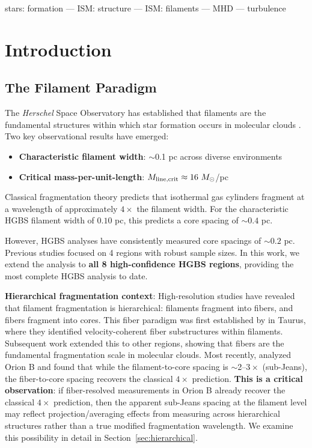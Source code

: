 \documentclass[11pt,a4paper]{article}
\begin{document}
stars: formation --- ISM: structure --- ISM: filaments --- MHD --- turbulence

\section{Introduction}

\subsection{The Filament Paradigm}

The \textit{Herschel} Space Observatory has established that filaments are the fundamental structures within which star formation occurs in molecular clouds \citep{Andre2010}. Two key observational results have emerged:

\begin{itemize}
    \item \textbf{Characteristic filament width}: $\sim$0.1 pc across diverse environments \citep{Arzoumanian2011}
    \item \textbf{Critical mass-per-unit-length}: $M_{\rm line,crit} \approx 16~M_\odot$/pc \citep{Ostriker1964}
\end{itemize}

Classical fragmentation theory \citep{Inutsuka1992} predicts that isothermal gas cylinders fragment at a wavelength of approximately $4\times$ the filament width. For the characteristic HGBS filament width of $0.10$ pc, this predicts a core spacing of $\sim0.4$ pc.

However, HGBS analyses have consistently measured core spacings of $\sim0.2$ pc. Previous studies focused on 4 regions with robust sample sizes. In this work, we extend the analysis to \textbf{all 8 high-confidence HGBS regions}, providing the most complete HGBS analysis to date.

\textbf{Hierarchical fragmentation context}: High-resolution studies have revealed that filament fragmentation is hierarchical: filaments fragment into fibers, and fibers fragment into cores. This fiber paradigm was first established by \citet{Hacar2013} in Taurus, where they identified velocity-coherent fiber substructures within filaments. Subsequent work \citep{Hacar2018} extended this to other regions, showing that fibers are the fundamental fragmentation scale in molecular clouds. Most recently, \citet{Yang2024} analyzed Orion B and found that while the filament-to-core spacing is $\sim$2--$3\times$ (sub-Jeans), the fiber-to-core spacing recovers the classical $4\times$ prediction. \textbf{This is a critical observation}: if fiber-resolved measurements in Orion B already recover the classical $4\times$ prediction, then the apparent sub-Jeans spacing at the filament level may reflect projection/averaging effects from measuring across hierarchical structures rather than a true modified fragmentation wavelength. We examine this possibility in detail in Section~\ref{sec:hierarchical}.
\end{document}
